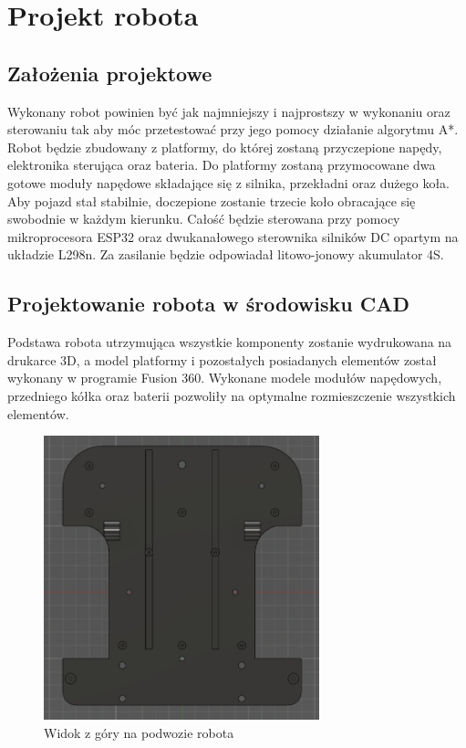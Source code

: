 \section{Projekt robota}
\subsection{Założenia projektowe}
Wykonany robot powinien być jak najmniejszy i najprostszy w wykonaniu oraz sterowaniu tak aby móc przetestować przy jego pomocy działanie algorytmu A*. 
Robot będzie zbudowany z platformy, do której zostaną przyczepione napędy, elektronika sterująca oraz bateria. 
Do platformy zostaną przymocowane dwa gotowe moduły napędowe składające się z silnika, przekładni oraz dużego koła. 
Aby pojazd stał stabilnie, doczepione zostanie trzecie koło obracające się swobodnie w każdym kierunku.
Całość będzie sterowana przy pomocy mikroprocesora ESP32 oraz dwukanałowego sterownika silników DC opartym na układzie L298n.
Za zasilanie będzie odpowiadał litowo-jonowy akumulator 4S.

\subsection{Projektowanie robota w środowisku CAD}
Podstawa robota utrzymująca wszystkie komponenty zostanie wydrukowana na drukarce 3D, a
model platformy i pozostałych posiadanych elementów został wykonany w programie Fusion 360.
Wykonane modele modułów napędowych, przedniego kółka oraz baterii pozwoliły na optymalne rozmieszczenie wszystkich elementów.

\begin{figure}[H]
	\centering
	\includegraphics[width=8cm]{pages/robot/zdjecia/robotModelRama.png}
	\caption{Widok z góry na podwozie robota}
	\label{Fig:robotModelRama}
\end{figure}

